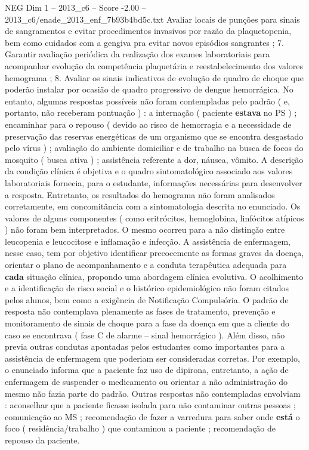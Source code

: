 \begin{textsample}{NEG Dim 1 – 2013\_c6 – Score -2.00 – 2013\_c6/enade\_2013\_enf\_7b93b4bd5c.txt}
Avaliar locais de punções para sinais de sangramentos e evitar procedimentos invasivos por razão da plaquetopenia, bem como cuidados com a gengiva pra evitar novos episódios sangrantes ; 7.
Garantir avaliação periódica da realização dos exames laboratoriais para acompanhar evolução da competência plaquetária e reestabelecimento dos valores hemograma ; 8.
Avaliar os sinais indicativos de evolução de quadro de choque que poderão instalar por ocasião de quadro progressivo de dengue hemorrágica.
No entanto, algumas respostas possíveis não foram contempladas pelo padrão ( e, portanto, não receberam pontuação ) : a internação ( paciente \textbf{estava} no PS ) ; encaminhar para o repouso ( devido ao risco de hemorragia e a necessidade de preservação das reservas energéticas de um organismo que se encontra desgastado pelo vírus ) ; avaliação do ambiente domiciliar e de trabalho na busca de focos do mosquito ( busca ativa ) ; assistência referente a dor, náusea, vômito.
A descrição da condição clínica é objetiva e o quadro sintomatológico associado aos valores laboratoriais fornecia, para o estudante, informações necessárias para desenvolver a resposta.
Entretanto, os resultados do hemograma não foram analisados corretamente, em concomitância com a sintomatologia descrita no enunciado.
Os valores de alguns componentes ( como eritrócitos, hemoglobina, linfócitos atípicos ) não foram bem interpretados.
O mesmo ocorreu para a não distinção entre leucopenia e leucocitose e inflamação e infecção.
A assistência de enfermagem, nesse caso, tem por objetivo identificar precocemente as formas graves da doença, orientar o plano de acompanhamento e a conduta terapêutica adequada para \textbf{cada} situação clínica, propondo uma abordagem clínica evolutiva.
O acolhimento e a identificação de risco social e o histórico epidemiológico não foram citados pelos alunos, bem como a exigência de Notificação Compulsória.
O padrão de resposta não contemplava plenamente as fases de tratamento, prevenção e monitoramento de sinais de choque para a fase da doença em que a cliente do caso se encontrava ( fase C de alarme – sinal hemorrágico ).
Além disso, não previa outras condutas apontadas pelos estudantes como importantes para a assistência de enfermagem que poderiam ser consideradas corretas.
Por exemplo, o enunciado informa que a paciente faz uso de dipirona, entretanto, a ação de enfermagem de suspender o medicamento ou orientar a não administração do mesmo não fazia parte do padrão.
Outras respostas não contempladas envolviam : aconselhar que a paciente ficasse isolada para não contaminar outras pessoas ; comunicação ao MS ; recomendação de fazer a varredura para saber onde \textbf{está} o foco ( residência/trabalho ) que contaminou a paciente ; recomendação de repouso da paciente.

\end{textsample}
